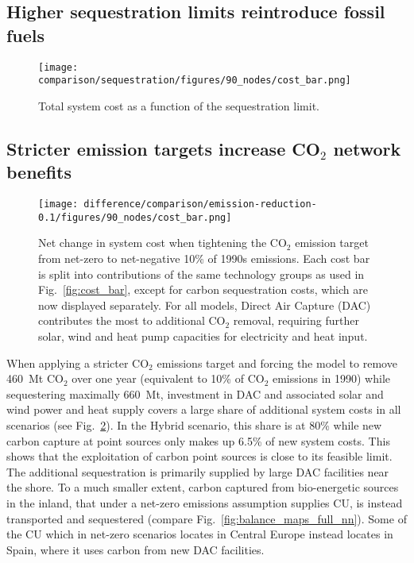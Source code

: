 \documentclass[twocolumn]{article}
\newcommand{\carbon}{CO$_2$}
\newcommand{\hybridscenario}{Hybrid scenario}
\begin{document}
\subsection*{Higher sequestration limits reintroduce fossil fuels}



\begin{figure}[htb!]
    \centering
    \texttt{[image: comparison/sequestration/figures/90\_nodes/cost\_bar.png]}
    \caption[short]{Total system cost as a function of the sequestration limit.}
    \label{fig:sequestration_cost_bar}
\end{figure}


\subsection*{Stricter emission targets increase \carbon{} network benefits}
\begin{figure}[htb!]
    \centering
    \texttt{[image: difference/comparison/emission-reduction-0.1/figures/90\_nodes/cost\_bar.png]}
    \caption[short]{Net change in system cost when tightening the \carbon{} emission target from net-zero to net-negative 10\% of 1990s emissions. Each cost bar is split into contributions of the same technology groups as used in Fig.~\ref{fig:cost_bar}, except for carbon sequestration costs, which are now displayed separately. For all models, Direct Air Capture (DAC) contributes the most to additional \carbon{} removal, requiring further solar, wind and heat pump capacities for electricity and heat input.}
    \label{fig:net-negative_cost_bar}
\end{figure}


When applying a stricter \carbon{} emissions target and forcing the model to remove 460~Mt \carbon{} over one year (equivalent to 10\% of \carbon{} emissions in 1990) while sequestering maximally 660~Mt, investment in DAC and associated solar and wind power and heat supply covers a large share of additional system costs in all scenarios (see Fig.~\ref{fig:net-negative_cost_bar}). In the \hybridscenario{}, this share is at 80\% while new carbon capture at point sources only makes up 6.5\% of new system costs. This shows that the exploitation of carbon point sources is close to its feasible limit. The additional sequestration is primarily supplied by large DAC facilities near the shore. To a much smaller extent, carbon captured from bio-energetic sources in the inland, that under a net-zero emissions assumption supplies CU, is instead transported and sequestered (compare Fig.~\ref{fig:balance_maps_full_nn}). Some of the CU which in net-zero scenarios locates in Central Europe instead locates in Spain, where it uses carbon from new DAC facilities.
\end{document}
